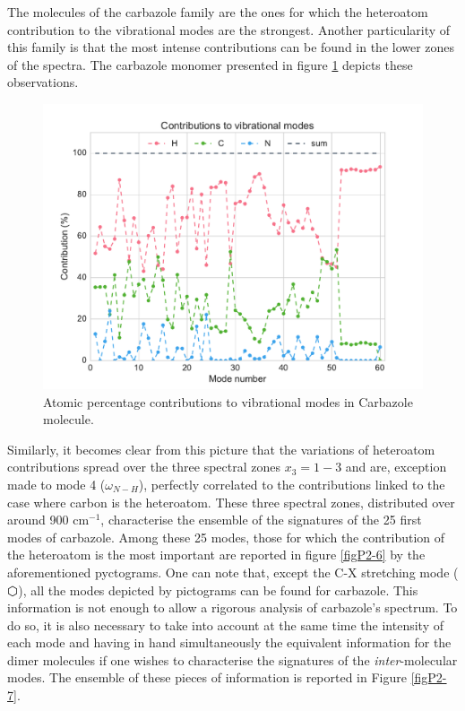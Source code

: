 The molecules of the carbazole family are the ones for which the heteroatom contribution to the vibrational modes are the strongest. Another particularity of this family is that the most intense contributions can be found in the lower zones of the spectra. The carbazole monomer presented in figure \ref{figP2-5} depicts these observations. 

 \begin{figure}[H]
 	\begin{center}
 		\includegraphics[scale=0.8]{image/P2-5}
 	\end{center}
 	\caption{Atomic percentage contributions to vibrational modes in Carbazole molecule.} \label{figP2-5}
 \end{figure}
	
	
	

	
	Similarly, it becomes clear from this picture that the variations of heteroatom contributions spread over the three spectral zones $x_3=1-3$ and are, exception made to mode 4 ($\omega_{N-H}$), perfectly correlated to the contributions linked to the case where carbon is the heteroatom. These three spectral zones, distributed over around 900 cm$^{-1}$, characterise the ensemble of the signatures of the 25 first modes of carbazole. Among these 25 modes, those for which the contribution of the heteroatom is the most important are reported in figure \ref{figP2-6} by the aforementioned pyctograms. One can note that, except the C-X stretching mode ($\varhexagon$), all the modes depicted by pictograms can be found for carbazole. This information is not enough to allow a rigorous analysis of carbazole’s spectrum. To do so, it is also necessary to take into account at the same time the intensity of each mode and having in hand simultaneously the equivalent information for the dimer molecules if one wishes to characterise the signatures of the \textit{inter}-molecular modes. The ensemble of these pieces of information is reported in Figure \ref{figP2-7}.
	 

